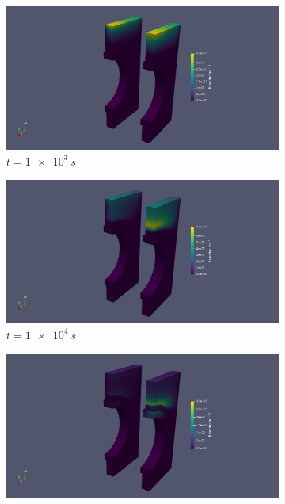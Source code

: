 \begin{figure} [h]
    \centering
    \begin{subfigure}{0.45\linewidth}
        \centering
        \includegraphics[trim=500 0 300 0, clip, width=\linewidth]{Figures/Chapter3/monoblocks/3D_monoblocks/retention_1e3s.png}
        \caption{$t=\SI{1e3}{s}$}
    \end{subfigure}%
    \qquad
    \begin{subfigure}{0.45\linewidth}
        \centering
        \includegraphics[trim=500 0 300 0, clip, width=\linewidth]{Figures/Chapter3/monoblocks/3D_monoblocks/retention_1e4s.png}
        \caption{$t=\SI{1e4}{s}$}
    \end{subfigure}
    \begin{subfigure}{0.45\linewidth}
        \centering
        \includegraphics[trim=500 0 300 0, clip, width=\linewidth]{Figures/Chapter3/monoblocks/3D_monoblocks/retention_1e5s.png}

\end{subfigure}
\end{figure}
